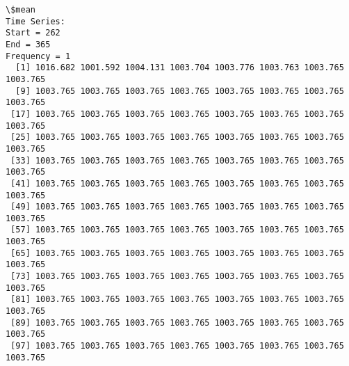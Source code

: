 \documentclass[11pt]{article}
\begin{document}
    \begin{Verbatim}[commandchars=\\\{\}]
\$mean
Time Series:
Start = 262 
End = 365 
Frequency = 1 
  [1] 1016.682 1001.592 1004.131 1003.704 1003.776 1003.763 1003.765 1003.765
  [9] 1003.765 1003.765 1003.765 1003.765 1003.765 1003.765 1003.765 1003.765
 [17] 1003.765 1003.765 1003.765 1003.765 1003.765 1003.765 1003.765 1003.765
 [25] 1003.765 1003.765 1003.765 1003.765 1003.765 1003.765 1003.765 1003.765
 [33] 1003.765 1003.765 1003.765 1003.765 1003.765 1003.765 1003.765 1003.765
 [41] 1003.765 1003.765 1003.765 1003.765 1003.765 1003.765 1003.765 1003.765
 [49] 1003.765 1003.765 1003.765 1003.765 1003.765 1003.765 1003.765 1003.765
 [57] 1003.765 1003.765 1003.765 1003.765 1003.765 1003.765 1003.765 1003.765
 [65] 1003.765 1003.765 1003.765 1003.765 1003.765 1003.765 1003.765 1003.765
 [73] 1003.765 1003.765 1003.765 1003.765 1003.765 1003.765 1003.765 1003.765
 [81] 1003.765 1003.765 1003.765 1003.765 1003.765 1003.765 1003.765 1003.765
 [89] 1003.765 1003.765 1003.765 1003.765 1003.765 1003.765 1003.765 1003.765
 [97] 1003.765 1003.765 1003.765 1003.765 1003.765 1003.765 1003.765 1003.765


\end{Verbatim}
\end{document}
